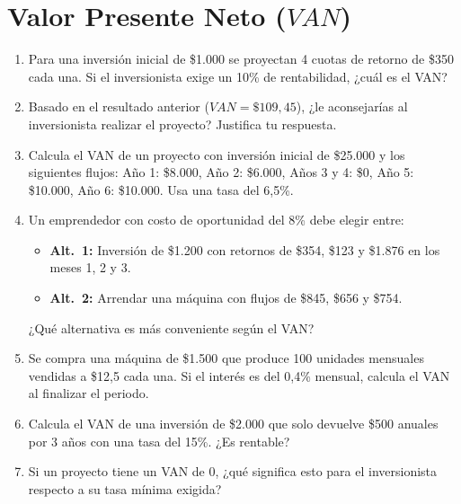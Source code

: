 \documentclass[12pt,a4paper]{article}
\newcommand{\answerspace}{\vspace{4.5cm}}
\begin{document}
\newpage

\section{Valor Presente Neto ($VAN$)}

\begin{enumerate}[label=\textbf{\arabic*.}, leftmargin=*, itemsep=0pt]

\item Para una inversión inicial de \$1.000 se proyectan 4 cuotas de retorno de \$350 cada una. Si el inversionista exige un 10\% de rentabilidad, ¿cuál es el VAN?
\answerspace

\item Basado en el resultado anterior ($VAN = \$109{,}45$), ¿le aconsejarías al inversionista realizar el proyecto? Justifica tu respuesta.
\answerspace

\item Calcula el VAN de un proyecto con inversión inicial de \$25.000 y los siguientes flujos: Año 1: \$8.000, Año 2: \$6.000, Años 3 y 4: \$0, Año 5: \$10.000, Año 6: \$10.000. Usa una tasa del 6,5\%.
\answerspace

\item Un emprendedor con costo de oportunidad del 8\% debe elegir entre:
  \begin{itemize}
    \item \textbf{Alt.\ 1:} Inversión de \$1.200 con retornos de \$354, \$123 y \$1.876 en los meses 1, 2 y 3.
    \item \textbf{Alt.\ 2:} Arrendar una máquina con flujos de \$845, \$656 y \$754.
  \end{itemize}
  ¿Qué alternativa es más conveniente según el VAN?
\answerspace

\item Se compra una máquina de \$1.500 que produce 100 unidades mensuales vendidas a \$12,5 cada una. Si el interés es del 0,4\% mensual, calcula el VAN al finalizar el periodo.
\answerspace

\item Calcula el VAN de una inversión de \$2.000 que solo devuelve \$500 anuales por 3 años con una tasa del 15\%. ¿Es rentable?
\answerspace

\item Si un proyecto tiene un VAN de 0, ¿qué significa esto para el inversionista respecto a su tasa mínima exigida?
\answerspace


\end{enumerate}
\end{document}
